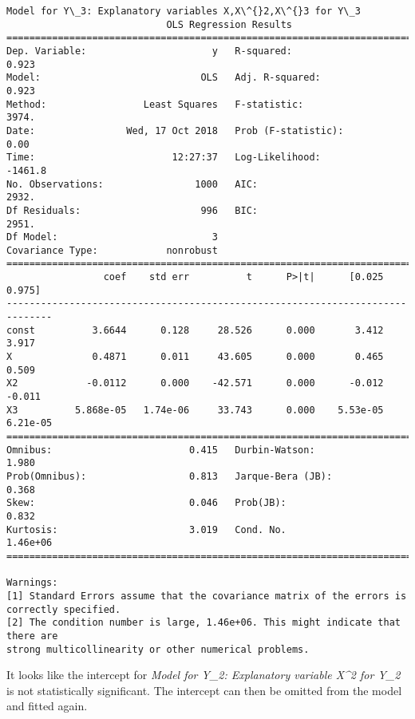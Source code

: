 \documentclass[11pt]{article}
\begin{document}
\begin{Verbatim}[commandchars=\\\{\}]
Model for Y\_3: Explanatory variables X,X\^{}2,X\^{}3 for Y\_3
                            OLS Regression Results                            
==============================================================================
Dep. Variable:                      y   R-squared:                       0.923
Model:                            OLS   Adj. R-squared:                  0.923
Method:                 Least Squares   F-statistic:                     3974.
Date:                Wed, 17 Oct 2018   Prob (F-statistic):               0.00
Time:                        12:27:37   Log-Likelihood:                -1461.8
No. Observations:                1000   AIC:                             2932.
Df Residuals:                     996   BIC:                             2951.
Df Model:                           3                                         
Covariance Type:            nonrobust                                         
==============================================================================
                 coef    std err          t      P>|t|      [0.025      0.975]
------------------------------------------------------------------------------
const          3.6644      0.128     28.526      0.000       3.412       3.917
X              0.4871      0.011     43.605      0.000       0.465       0.509
X2            -0.0112      0.000    -42.571      0.000      -0.012      -0.011
X3          5.868e-05   1.74e-06     33.743      0.000    5.53e-05    6.21e-05
==============================================================================
Omnibus:                        0.415   Durbin-Watson:                   1.980
Prob(Omnibus):                  0.813   Jarque-Bera (JB):                0.368
Skew:                           0.046   Prob(JB):                        0.832
Kurtosis:                       3.019   Cond. No.                     1.46e+06
==============================================================================

Warnings:
[1] Standard Errors assume that the covariance matrix of the errors is correctly specified.
[2] The condition number is large, 1.46e+06. This might indicate that there are
strong multicollinearity or other numerical problems.

    \end{Verbatim}

    It looks like the intercept for \emph{Model for Y\_2: Explanatory
variable X\^{}2 for Y\_2} is not statistically significant. The
intercept can then be omitted from the model and fitted again.
\end{document}
